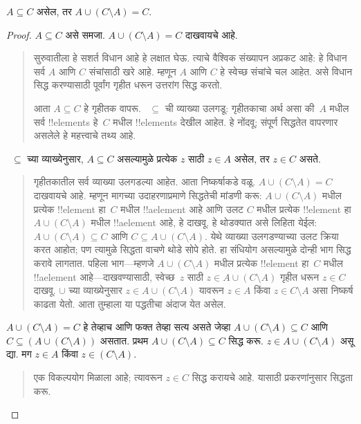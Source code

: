 \documentclass[../../../include/open-logic-section]{subfiles}
\begin{document}


\begin{prop}
$A \subseteq C$ असेल, तर $A \cup (C \setminus A) = C$.
\end{prop}

\begin{proof}
$A \subseteq C$ असे समजा. $A \cup (C \setminus A) = C$ दाखवायचे आहे.
\begin{quote}
सुरुवातीला हे सशर्त विधान आहे हे लक्षात घेऊ. त्याचे वैश्विक संख्यापन अप्रकट आहे: हे विधान सर्व $A$ आणि $C$ संचांसाठी खरे आहे. म्हणून $A$ आणि $C$ हे स्वेच्छ संचांचे चल आहेत. असे विधान सिद्ध करण्यासाठी पूर्वांग गृहीत धरून उत्तरांग सिद्ध करतो.

आता $A \subseteq C$ हे गृहीतक वापरू. ~$\subseteq$ ची व्याख्या उलगडू: गृहीतकाचा अर्थ असा की~$A$ मधील सर्व !!{element}s हे~$C$ मधील !!{element}s देखील आहेत. हे नोंदवू; संपूर्ण सिद्धतेत वापरणार असलेले हे महत्त्वाचे तथ्य आहे.
\end{quote}
~$\subseteq$ च्या व्याख्येनुसार, $A \subseteq C$ असल्यामुळे प्रत्येक $z$ साठी $z \in A$ असेल, तर $z \in C$ असते.
\begin{quote}
गृहीतकातील सर्व व्याख्या उलगडल्या आहेत. आता निष्कर्षाकडे वळू. $A \cup (C \setminus A) = C$ दाखवायचे आहे. म्हणून मागच्या उदाहरणाप्रमाणे सिद्धतेची मांडणी करू: $A \cup (C \setminus A)$ मधील प्रत्येक !!{element} हा~$C$ मधील !!a{element} आहे आणि उलट $C$ मधील प्रत्येक !!{element} हा $A \cup (C \setminus A)$ मधील !!a{element} आहे, हे दाखवू. हे थोडक्यात असे लिहिता येईल: $A \cup (C \setminus A) \subseteq C$ आणि $C \subseteq A \cup (C \setminus A)$. येथे व्याख्या उलगडण्याच्या उलट क्रिया करत आहोत; पण त्यामुळे सिद्धता वाचणे थोडे सोपे होते. हा संधियोग असल्यामुळे दोन्ही भाग सिद्ध करावे लागतात. पहिला भाग---म्हणजे $A \cup (C \setminus A)$ मधील प्रत्येक !!{element} हा~$C$ मधील !!a{element} आहे---दाखवण्यासाठी, स्वेच्छ~$z$ साठी $z \in A \cup (C \setminus A)$ गृहीत धरून $z \in C$ दाखवू. $\cup$ च्या व्याख्येनुसार $z \in A \cup (C \setminus A)$ यावरून $z \in A$ किंवा $z \in C \setminus A$ असा निष्कर्ष काढता येतो. आता तुम्हाला या पद्धतीचा अंदाज येत असेल.
\end{quote}
$A \cup (C \setminus A) = C$ हे तेव्हाच आणि फक्त तेव्हा सत्य असते जेव्हा $A \cup (C \setminus A) \subseteq C$ आणि $C \subseteq (A \cup (C \setminus A))$ असतात. प्रथम $A \cup (C \setminus A) \subseteq C$ सिद्ध करू. $z \in A \cup (C \setminus A)$ असू द्या. मग $z \in A$ किंवा $z \in (C \setminus A)$.
\begin{quote}
एक विकल्पयोग मिळाला आहे; त्यावरून $z \in C$ सिद्ध करायचे आहे. यासाठी प्रकरणांनुसार सिद्धता करू.

\end{quote}
\end{proof}
\end{document}
